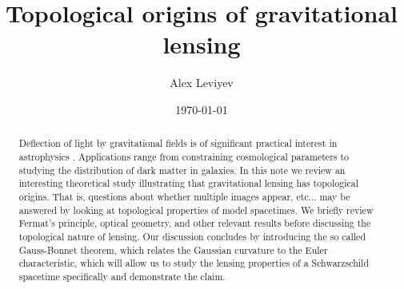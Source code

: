 \documentclass{article}
\theoremstyle{definition}
\theoremstyle{plain}
\theoremstyle{remark}
\begin{document}
\title{Topological origins of gravitational lensing}
\author[1]{Alex Leviyev}
\date{\today}
\maketitle

\begin{abstract}
Deflection of light by gravitational fields is of significant practical interest in astrophysics \cite{congdon2018principles}. Applications range from constraining cosmological parameters to studying the distribution of dark matter in galaxies. In this note we review an interesting theoretical study illustrating that gravitational lensing has topological origins. That is, questions about whether multiple images appear, etc... may be answered by looking at topological properties of model spacetimes. We briefly review Fermat's principle, optical geometry, and other relevant results before discussing the topological nature of lensing. Our discussion concludes by introducing the so called Gauss-Bonnet theorem, which relates the Gaussian curvature to the Euler characteristic, which will allow us to study the lensing properties of a Schwarzschild spacetime specifically and demonstrate the claim.
\end{abstract}

% 
% 
% 



\end{document}
